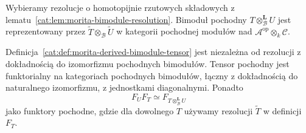\begin{definicja}\label{cat:def:morita-derived-bimodule-tensor}
Wybieramy rezolucje o homotopijnie rzutowych składowych z lematu~\ref{cat:lem:morita-bimodule-resolution}. Bimoduł pochodny $T\otimes_{\mathcal B}^{\mathbf L} U$ jest reprezentowany przez $\widetilde T\otimes_{\mathcal B}\widetilde U$ w kategorii pochodnej modułów nad $\mathcal A^{\mathrm{op}}\otimes_k\mathcal C$.
\end{definicja}

\begin{stwierdzenie}\label{cat:prop:morita-derived-composition}
Definicja~\ref{cat:def:morita-derived-bimodule-tensor} jest niezależna od rezolucji z dokładnością do izomorfizmu pochodnych bimodułów. Tensor pochodny jest funktorialny na kategoriach pochodnych bimodułów, łączny z dokładnością do naturalnego izomorfizmu, z jednostkami diagonalnymi. Ponadto
\[
 F_U F_T\simeq F_{T\otimes_{\mathcal B}^{\mathbf L} U}
\]
jako funktory pochodne, gdzie dla dowolnego $T$ używamy rezolucji $\widetilde T$ w definicji $F_T$.
\end{stwierdzenie}
